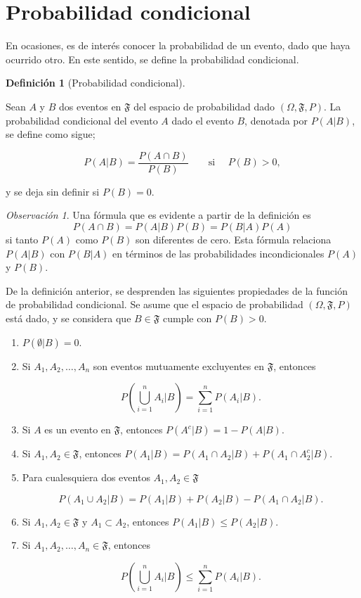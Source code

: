 \documentclass[
  us-letterpaper,
]{scrreprt}
\theoremstyle{plain}
\theoremstyle{definition}
\theoremstyle{plain}
\theoremstyle{definition}
\newtheorem{definition}{Definición}[chapter]
\theoremstyle{remark}
\newtheorem*{remark}{Observación}
\begin{document}
\section{Probabilidad condicional}\label{probabilidad-condicional}

En ocasiones, es de interés conocer la probabilidad de un evento, dado
que haya ocurrido otro. En este sentido, se define la probabilidad
condicional.

\begin{definition}[Probabilidad
condicional]\protect\hypertarget{def-pcond}{}\label{def-pcond}

Sean \(A\) y \(B\) dos eventos en \(\mathfrak{F}\) del espacio de
probabilidad dado \((\Omega, \mathfrak{F}, P)\). La probabilidad
condicional del evento \(A\) dado el evento \(B\), denotada por
\(P(A|B)\), se define como sigue;

\[P(A|B)= \frac{P(A\cap B)}{P(B)}\qquad\text{si }\quad P(B)>0,\]

y se deja sin definir si \(P(B)=0\).

\end{definition}

\begin{remark}
Una fórmula que es evidente a partir de la definición es
\[P(A\cap B)= P(A|B)P(B)=P(B|A)P(A)\] si tanto \(P(A)\) como \(P(B)\)
son diferentes de cero. Esta fórmula relaciona \(P(A|B)\) con \(P(B|A)\)
en términos de las probabilidades incondicionales \(P(A)\) y \(P(B)\).
\end{remark}

De la definición anterior, se desprenden las siguientes propiedades de
la función de probabilidad condicional. Se asume que el espacio de
probabilidad \((\Omega, \mathfrak{F}, P)\) está dado, y se considera que
\(B\in\mathfrak{F}\) cumple con \(P(B)>0\).

\begin{enumerate}
\def\labelenumi{\roman{enumi}.}
\item
  \(P(\emptyset| B)=0\).
\item
  Si \(A_1, A_2, \ldots, A_n\) son eventos mutuamente excluyentes en
  \(\mathfrak{F}\), entonces

  \[P\left(\bigcup_{i=1}^n A_i|B\right)= \sum_{i=1}^n P(A_i|B).\]
\item
  Si \(A\) es un evento en \(\mathfrak{F}\), entonces
  \(P(A^c| B)=1-P(A|B)\).
\item
  Si \(A_1, A_2\in \mathfrak{F}\), entonces
  \(P(A_1|B)=P(A_1\cap A_2|B)+ P(A_1\cap A_2^c|B)\).
\item
  Para cualesquiera dos eventos \(A_1,A_2\in \mathfrak{F}\)

  \[P(A_1\cup A_2|B)=P(A_1|B)+P(A_2|B)-P(A_1\cap A_2|B).\]
\item
  Si \(A_1, A_2\in\mathfrak{F}\) y \(A_1\subset A_2\), entonces
  \(P(A_1|B)\leq P(A_2|B)\).
\item
  Si \(A_1, A_2,\ldots, A_n\in\mathfrak{F}\), entonces

  \[P\left(\bigcup_{i=1}^n A_i|B\right)\leq \sum_{i=1}^n P(A_i|B).\]
\end{enumerate}
\end{document}
